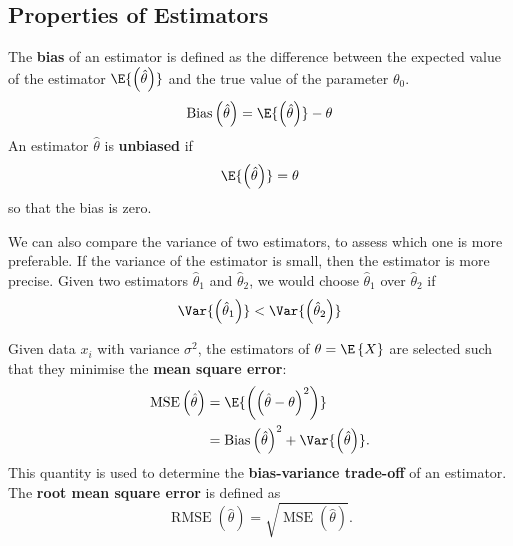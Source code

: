 \documentclass{article}
\begin{document}
\begin{multicols}{3}
\subsection{Properties of Estimators}
\begin{definition}[Bias]
    The \textbf{bias} of an estimator is defined as
    the difference between the expected value of the estimator \(\E{\left( \hat{\theta} \right)}\) and the true value of the parameter \(\theta_0\).
    \begin{equation*}
        \operatorname{Bias}\left( \hat{\theta} \right) = \E{\left( \hat{\theta} \right)} - \theta
    \end{equation*}
    An estimator \(\hat{\theta}\) is \textbf{unbiased} if
    \begin{equation*}
        \E{\left( \hat{\theta} \right)} = \theta
    \end{equation*}
    so that the bias is zero.
\end{definition}
We can also compare the variance of two estimators, to assess which one is more preferable.
If the variance of the estimator is small, then the estimator is more precise.
Given two estimators \(\hat{\theta}_1\) and \(\hat{\theta}_2\), we would choose \(\hat{\theta}_1\) over \(\hat{\theta}_2\) if
\begin{equation*}
    \Var{\left( \hat{\theta}_1 \right)} < \Var{\left( \hat{\theta}_2 \right)}
\end{equation*}
\begin{definition}
    Given data \(x_i\) with variance \(\sigma^2\), the estimators of \(\theta = \E\left\{ X \right\}\)
    are selected such that they minimise the \textbf{mean square error}:
    \begin{align*}
        \operatorname{MSE}\left( \hat{\theta} \right) & = \E{\left( \left( \hat{\theta} - \theta \right)^2 \right)}                             \\
                                                      & = \operatorname{Bias}\left( \hat{\theta} \right)^2 + \Var{\left( \hat{\theta} \right)}.
    \end{align*}
    This quantity is used to determine the \textbf{bias-variance trade-off} of an estimator.
    The \textbf{root mean square error} is defined as
    \begin{equation*}
        \operatorname{RMSE}\left( \hat{\theta} \right) = \sqrt{\operatorname{MSE}\left( \hat{\theta} \right)}.
    \end{equation*}
\end{definition}

\end{multicols}
\end{document}
